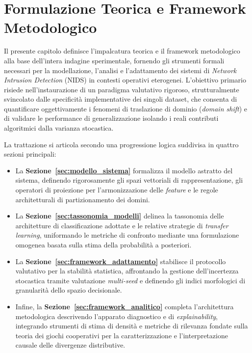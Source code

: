 \chapter{Formulazione Teorica e Framework Metodologico}
\label{ch:metodologia}

Il presente capitolo definisce l'impalcatura teorica e il framework metodologico alla base dell'intera indagine sperimentale, fornendo gli strumenti formali necessari per la modellazione, l'analisi e l'adattamento dei sistemi di \textit{Network Intrusion Detection} (NIDS) in contesti operativi eterogenei. L'obiettivo primario risiede nell'instaurazione di un paradigma valutativo rigoroso, strutturalmente svincolato dalle specificità implementative dei singoli dataset, che consenta di quantificare oggettivamente i fenomeni di traslazione di dominio (\textit{domain shift}) e di validare le performance di generalizzazione isolando i reali contributi algoritmici dalla varianza stocastica.

La trattazione si articola secondo una progressione logica suddivisa in quattro sezioni principali:
\begin{itemize}
    \item La \textbf{Sezione~\ref{sec:modello_sistema}} formalizza il modello astratto del sistema, definendo rigorosamente gli spazi vettoriali di rappresentazione, gli operatori di proiezione per l'armonizzazione delle \textit{feature} e le regole architetturali di partizionamento dei domini.
    \item La \textbf{Sezione~\ref{sec:tassonomia_modelli}} delinea la tassonomia delle architetture di classificazione adottate e le relative strategie di \textit{transfer learning}, uniformando le metriche di confronto mediante una formulazione omogenea basata sulla stima della probabilità a posteriori.
    \item La \textbf{Sezione~\ref{sec:framework_adattamento}} stabilisce il protocollo valutativo per la stabilità statistica, affrontando la gestione dell'incertezza stocastica tramite valutazione \textit{multi-seed} e definendo gli indici morfologici di granularità dello spazio decisionale.
    \item Infine, la \textbf{Sezione~\ref{sec:framework_analitico}} completa l'architettura metodologica descrivendo l'apparato diagnostico e di \textit{explainability}, integrando strumenti di stima di densità e metriche di rilevanza fondate sulla teoria dei giochi cooperativi per la caratterizzazione e l'interpretazione causale delle divergenze distributive.
\end{itemize}

